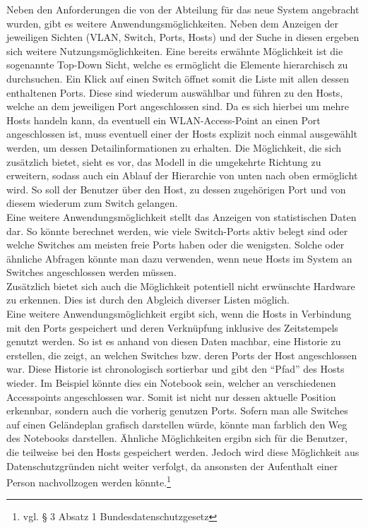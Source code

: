 Neben den Anforderungen die von der Abteilung für das neue System angebracht wurden, gibt es weitere Anwendungsmöglichkeiten. Neben dem Anzeigen der jeweiligen Sichten (VLAN, Switch, Ports, Hosts) und der Suche in diesen ergeben sich weitere Nutzungsmöglichkeiten. Eine bereits erwähnte Möglichkeit ist die sogenannte Top-Down Sicht, welche es ermöglicht die Elemente hierarchisch zu durchsuchen. Ein Klick auf einen Switch öffnet somit die Liste mit allen dessen enthaltenen Ports. Diese sind wiederum auswählbar und führen zu den Hosts, welche an dem jeweiligen Port angeschlossen sind.
Da es sich hierbei um mehre Hosts handeln kann, da eventuell ein WLAN-Access-Point an einen Port angeschlossen ist, muss eventuell einer der Hosts explizit noch einmal ausgewählt werden, um dessen Detailinformationen zu erhalten.
Die Möglichkeit, die sich zusätzlich bietet, sieht es vor, das Modell in die umgekehrte Richtung zu erweitern, sodass auch ein Ablauf der Hierarchie von unten nach oben ermöglicht wird.
So soll der Benutzer über den Host, zu dessen zugehörigen Port und von diesem wiederum zum Switch gelangen.\\
Eine weitere Anwendungsmöglichkeit stellt das Anzeigen von statistischen Daten dar.
So könnte berechnet werden, wie viele Switch-Ports aktiv belegt sind oder welche Switches am meisten freie Ports haben oder die wenigsten. Solche oder ähnliche Abfragen könnte man dazu verwenden, wenn neue Hosts im System an Switches angeschlossen werden müssen.\\ Zusätzlich bietet sich auch die Möglichkeit potentiell nicht erwünschte Hardware zu erkennen.
Dies ist durch den Abgleich diverser Listen möglich.\\
Eine weitere Anwendungsmöglichkeit ergibt sich, wenn die Hosts in Verbindung mit den Ports gespeichert und deren Verknüpfung inklusive des Zeitstempels genutzt werden.
So ist es anhand von diesen Daten machbar, eine Historie zu erstellen, die zeigt, an welchen Switches bzw. deren Ports der Host angeschlossen war. Diese Historie ist chronologisch sortierbar und gibt den “Pfad” des Hosts wieder. Im Beispiel könnte dies ein Notebook sein, welcher an verschiedenen Accesspoints angeschlossen war.
Somit ist nicht nur dessen aktuelle Position erkennbar, sondern auch die vorherig genutzen Ports.
Sofern man alle Switches auf einen Geländeplan grafisch darstellen würde, könnte man farblich den Weg des Notebooks darstellen.
Ähnliche Möglichkeiten ergibn sich für die Benutzer, die teilweise bei den Hosts gespeichert werden.
Jedoch wird diese Möglichkeit aus Datenschutzgründen nicht weiter verfolgt, da ansonsten der Aufenthalt einer Person nachvollzogen werden könnte.\footnote{vgl. § 3 Absatz 1 Bundesdatenschutzgesetz}\\
